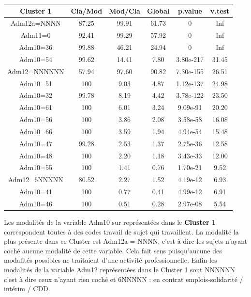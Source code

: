 \documentclass{book}
\begin{document}
\setlength\arrayrulewidth{2pt}
\begin{tabular}{|c||ccccc|}
\hline
  \textbf{\textcolor{black}{Cluster 1}}       &    Cla/Mod  &   Mod/Cla   &   Global   &    p.value  &   v.test  \\
\hline
\hline 
            
Adm12a=NNNN  & 87.25 &99.91 &61.73  &0 &       Inf\\
Adm11=0      & 92.41 &99.29 &57.92  &0 &       Inf\\
Adm10=36     & 99.88 &46.21 &24.94  &0 &      Inf\\
Adm10=54     & 99.62 &14.41 & 7.80 &3.80e-217  &31.45\\
Adm12=NNNNNN & 57.94 &97.60 &90.82 &7.30e-155 & 26.51\\
Adm10=51     & 100 & 9.03 & 4.87 &1.12e-137  &24.98\\
Adm10=32     & 99.78 & 8.19 & 4.42 &3.78e-122  &23.50\\
Adm10=61     & 100 & 6.01 & 3.24 & 9.09e-91 & 20.20\\
Adm10=56     & 100 & 3.86 & 2.08 & 3.58e-58 & 16.08\\
Adm10=66     & 100 & 3.59 & 1.94 & 4.94e-54 & 15.48\\
Adm10=47     & 99.28 & 2.53 & 1.37 & 2.75e-36 & 12.58\\
Adm10=48    & 100 & 2.20 & 1.18 & 3.43e-33 & 12.00\\
Adm10=55    & 100& 1.41 & 0.76 & 1.70e-21 &  9.52\\
Adm12=6NNNNN & 80.52 & 2.27 & 1.52 & 4.19e-12  & 6.93\\
Adm10=41    & 100 & 0.77 & 0.41 & 4.99e-12 &  6.91\\
Adm10=46    & 100 &0.51 & 0.28 & 2.97e-08 &  5.54\\
\hline
\end{tabular}

\bigskip
Les modalités de la variable Adm10 sur représentées dans le \textbf{\textcolor{black}{Cluster 1}} correspondent toutes à des codes travail de sujet qui travaillent. La modalité la plus présente dans ce Cluster est Adm12a = NNNN, c'est à dire les sujets n'ayant coché aucune modalité de cette variable. Cela fait sens puisqu'aucune des modalités possibles ne traitaient d'une activité professionnelle. Enfin les modalités de la variable Adm12 représentées dans le Cluster 1 sont NNNNNN c'est à dire ceux n'ayant rien coché et 6NNNNN : en contrat emplois-solidarité / intérim / CDD.
\end{document}
